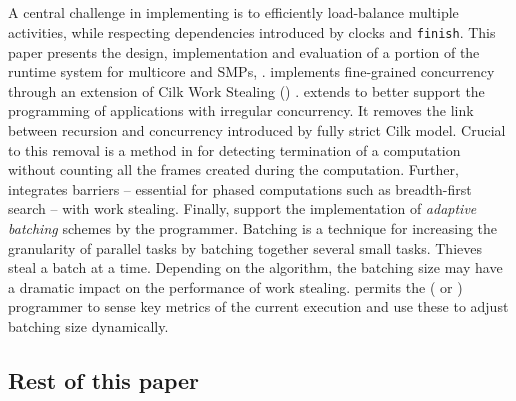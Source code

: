 \subsection{\XWS}
A central challenge in implementing \Xten{} is to efficiently
load-balance multiple activities, while respecting dependencies
introduced by clocks and {\tt finish}. This paper presents the design,
implementation and evaluation of a portion of the \Xten{} runtime
system for multicore and SMPs, \XWS{}. \XWS{} implements fine-grained
concurrency through an extension of Cilk Work Stealing (\CWS)
\cite{BJKLRZ95,frigo98implementation}.  
%
\XWS{} extends \CWS{} to better support the programming of
applications with irregular concurrency. It removes the link between
recursion and concurrency introduced by fully strict Cilk
model. Crucial to this removal is a method in \XWS{} for detecting
termination of a computation without counting all the frames created
during the computation.  Further, \XWS{} integrates barriers --
essential for phased computations such as breadth-first search -- with
work stealing. Finally, \XWS{} support the implementation of {\em
adaptive batching} schemes by the programmer. Batching is a technique
for increasing the granularity of parallel tasks by batching together
several small tasks. Thieves steal a batch at a time. Depending on the
algorithm, the batching size may have a dramatic impact on the
performance of work stealing.  \XWS{} permits the
(\Xten{} or \XWS{}) programmer to sense key metrics of the current
execution and use these to adjust batching size dynamically.

\subsection{Rest of this paper}

